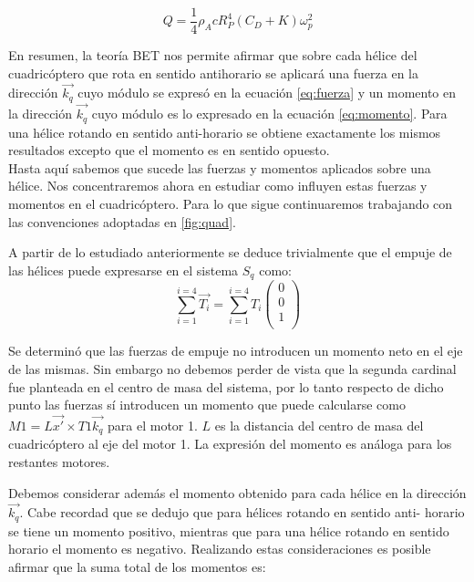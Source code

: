 \documentclass[main]{subfiles}
\begin{document}
\begin{equation}
\label{eq:momento}
Q=\frac{1}{4}\rho_A c R_P^4(C_D+K)\omega_p^2
\end{equation}

 

En resumen, la teor\'ia BET nos permite afirmar que sobre cada h\'elice del cuadric\'optero que rota en sentido antihorario se aplicar\'a una fuerza en la direcci\'on $\vec{k_q}$ cuyo m\'odulo se expres\'o en la ecuaci\'on \ref{eq:fuerza} y un momento en la direcci\'on $\vec{k_q}$ cuyo m\'odulo es lo expresado en la ecuaci\'on \ref{eq:momento}. Para una h\'elice rotando en sentido anti-horario se obtiene exactamente los mismos resultados excepto que el momento es en sentido opuesto.\\

Hasta aqu\'i sabemos que sucede las fuerzas y momentos aplicados sobre una h\'elice. Nos concentraremos ahora en estudiar como influyen estas fuerzas y momentos en el cuadric\'optero. Para lo que sigue continuaremos trabajando con las convenciones adoptadas en \ref{fig:quad}. 
 
A partir de lo estudiado anteriormente se deduce trivialmente que el empuje de las h\'elices puede expresarse en el sistema $S_q$ como:
$$
\sum_{i=1}^{i=4} \vec{T_i} =\sum_{i=1}^{i=4}T_i\left(\begin{array}{c}
0\\
0\\
1\\
\end{array} \right)
$$

Se determin\'o que las fuerzas de empuje no introducen un momento neto en el eje de las mismas. Sin embargo no debemos perder de vista que la segunda cardinal fue planteada en el centro de masa del sistema, por lo tanto respecto de dicho punto las fuerzas s\'i introducen un momento que puede calcularse como $M1=L\vec{x\prime} \times T1\vec{k_q}$ para el motor 1. $L$ es la distancia del centro de masa del cuadric\'optero al eje del motor 1. La expresi\'on del momento es an\'aloga para los restantes motores.

Debemos considerar adem\'as el momento obtenido para cada h\'elice en la direcci\'on $\vec{k_q}$. Cabe recordad que se dedujo que para h\'elices rotando en sentido anti- horario se tiene un momento positivo, mientras que para una h\'elice rotando en sentido horario el momento es negativo. Realizando estas consideraciones es posible afirmar que la suma total de los momentos es:
\end{document}
